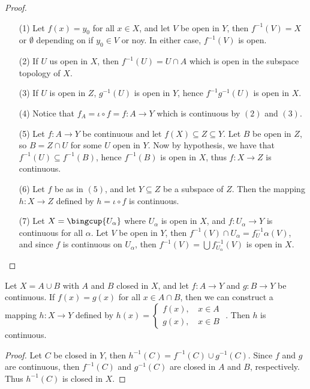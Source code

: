 \begin{proof}
    \begin{enumerate}
        \item[(1)] Let $f (x)=y_0$ for all $x \in X$, and let  $V$ be open in  $Y$, then  $f^{-1}(V)=X$
            or $\emptyset$ depending on if $ y_0 \in V$ or noy. In either case, $f^{-1}(V)$ is open.

        \item[(2)] If $U$ us open in  $X$, then  $f^{-1}(U)=U \cap A$ which is open in the subspace
            topology of $X$.

        \item[(3)] If $U$ is open in  $Z$,  $g^{-1}(U)$ is open in $Y$, hence  $f^{-1}g^{-1}(U)$ is
            open in $X$.

        \item[(4)] Notice that  $f_A=\iota \circ f=f:A \rightarrow Y$ which is continuous by $(2)$
            and $(3)$.

        \item[(5)] Let $f:A \rightarrow Y$ be continuous and let  $f(X) \subseteq Z \subseteq Y$. Let $B$
            be open in  $Z$, so  $B=Z \cap U$ for some  $U$ open in  $Y$. Now by hypothesis, we have
            that $f^{-1}(U) \subseteq f^{-1}(B)$, hence $f^{-1}(B)$ is open in $X$, thus  $f:X
            \rightarrow Z$ is continuous.

        \item[(6)] Let  $f$ be as in  $(5)$, and let $Y \subseteq Z$ be a subspace of  $Z$. Then the
            mapping  $h:X \rightarrow Z$ defined by $h=\iota \circ f$ is continuous.

        \item[(7)] Let  $X=\bingcup{U_{\alpha}}$ where $U_{\alpha}$ is open in $X$, and $f:U_{\alpha}
            \rightarrow Y$ is continuous for all  $\alpha$. Let $V$ be open in  $Y$, then
            $f^{-1}(V) \cap U_{\alpha}=f^{-1}_U{\alpha}(V)$, and since $f$ is continuous on
            $U_{\alpha}$, then $f^{-1}(V)=\bigcup{f^{-1}_{U_{\alpha}}(V)}$ is open in $X$.
    \end{enumerate}
\end{proof}

\begin{theorem}\label{1.7.5}
    Let $X=A \cup B$ with  $A$ and  $B$ closed in  $X$, and let  $f:A \rightarrow Y$ and  $g:B
    \rightarrow Y$ be continuous. If  $f(x)=g(x)$ for all $x \in A \cap B$, then we can
    construct a mapping  $h:X \rightarrow Y$ defined by  $h(x)=
        \begin{cases}
            f(x) \text{, } & x \in A \\
            g(x) \text{, } & x \in B
        \end{cases}$
    . Then $h$ is continuous.
\end{theorem}
\begin{proof}
    Let $C$ be closed in  $Y$, then  $h^{-1}(C)=f^{-1}(C) \cup g^{-1}(C)$. Since $f$ and  $g$ are
    continuous, then  $f^{-1}(C)$ and $g^{-1}(C)$ are closed in $A$ and  $B$, respectively. Thus
    $h^{-1}(C)$ is closed in $X$.
\end{proof}

